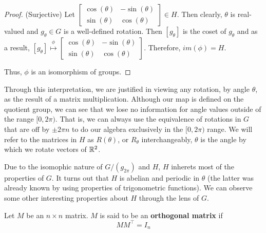 \begin{proof}
(Surjective) Let $\begin{bmatrix}
			\cos(\theta) & -\sin(\theta) \\
			\sin(\theta) & \cos(\theta)
		\end{bmatrix}\in H$. Then clearly, $\theta$ is real-valued and $g_\theta\in G$ is a well-defined rotation. Then $[g_\theta]$ is the coset of $g_\theta$ and as a result, $[g_\theta] \overset{\phi}{\mapsto} \begin{bmatrix}
			\cos(\theta) & -\sin(\theta) \\
			\sin(\theta) & \cos(\theta)
		\end{bmatrix}$. Therefore, $im(\phi) = H$.

Thus, $\phi$ is an isomorphism of groups. \end{proof}


Through this interpretation, we are justified in viewing any rotation, by angle $\theta$, as the result of a matrix multiplication. Although our map is defined on the quotient group, we can see that we lose no information for angle values outside of the range $[0,2\pi)$. That is, we can always use the equivalence of rotations in $G$ that are off by $\pm 2\pi n$ to do our algebra exclusively in the $[0,2\pi)$ range. We will refer to the matrices in $H$ as $R(\theta)$, or $R_\theta$ interchangeably, $\theta$ is the angle by which we rotate vectors of $\mathbb{R}^2$. 

Due to the isomophic nature of $G/(g_{2\pi})$ and $H$, $H$ inherets most of the properties of $G$. It turns out that $H$ is abelian and periodic in $\theta$ (the latter was already known by using properties of trigonometric functions). We can observe some other interesting properties about $H$ through the lens of $G$.

\begin{definition}
	Let $M$ be an $n\times n$ matrix. $M$ is said to be an \textbf{orthogonal matrix} if $$MM^\intercal=I_n$$
\end{definition}

